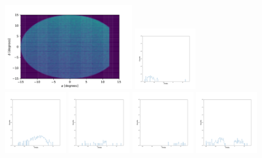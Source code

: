 \documentclass[12pt,prd]{article}
\begin{document}
\begin{figure}[h!]
\centering
\includegraphics[width=0.5\textwidth]{../figures/histogram2dgaiascan_l101_2_b58_4_ra212_7_dec55_2_npy.pdf}
\includegraphics[width=0.24\textwidth]{../figures/stars_near_zero_rahistgaiascan_l101_2_b58_4_ra212_7_dec55_2_npy_0.pdf}
\includegraphics[width=0.24\textwidth]{../figures/stars_near_zero_rahistgaiascan_l101_2_b58_4_ra212_7_dec55_2_npy_1.pdf}
\includegraphics[width=0.24\textwidth]{../figures/stars_near_zero_rahistgaiascan_l101_2_b58_4_ra212_7_dec55_2_npy_2.pdf}
\includegraphics[width=0.24\textwidth]{../figures/stars_near_zero_rahistgaiascan_l101_2_b58_4_ra212_7_dec55_2_npy_3.pdf}
\includegraphics[width=0.24\textwidth]{../figures/stars_near_zero_rahistgaiascan_l101_2_b58_4_ra212_7_dec55_2_npy_4.pdf}

\end{figure}
\end{document}
